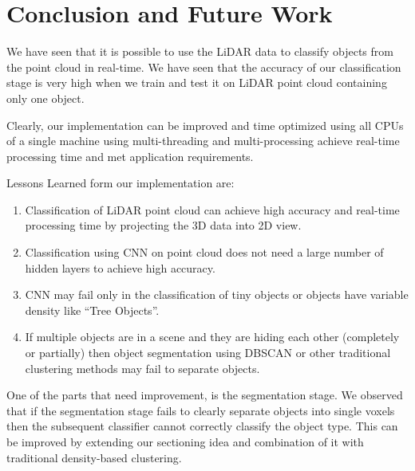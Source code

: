 \section{Conclusion and Future Work}\label{sec:conclusion}
We have seen that it is possible to use the LiDAR data to classify objects from the point cloud in real-time.
We have seen that the accuracy of our classification stage is very high when we train and test it on LiDAR point cloud containing only one object.


Clearly, our implementation can be improved and time optimized using all CPUs of a single machine using multi-threading and multi-processing achieve real-time processing time and met application requirements.


Lessons Learned form our implementation are:

\begin{enumerate}
  \item Classification of LiDAR point cloud can achieve high accuracy and real-time processing time by projecting the 3D data into 2D view.
  \item Classification using CNN on point cloud does not need a large number of hidden layers to achieve high accuracy.
  \item CNN may fail only in the classification of tiny objects or objects have variable density like ``Tree Objects''.
  \item If multiple objects are in a scene and they are hiding each other (completely or partially) then object segmentation using DBSCAN or other traditional clustering methods may fail to separate objects.
\end{enumerate}

One of the parts that need improvement, is the segmentation stage. We observed that if the segmentation stage fails to clearly separate objects into single voxels then the subsequent classifier cannot correctly classify the object type. This can be improved by extending our sectioning idea and combination of it with traditional density-based clustering.
